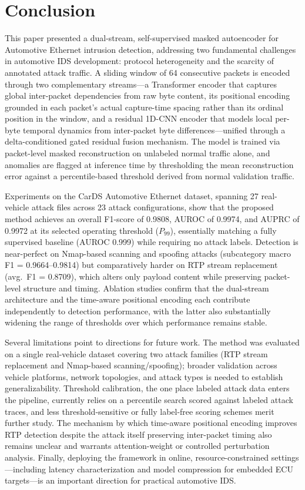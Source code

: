 \section{Conclusion}
\label{sec:conclusion}
This paper presented a dual-stream, self-supervised masked autoencoder for Automotive Ethernet intrusion detection, addressing two fundamental challenges in automotive IDS development: protocol heterogeneity and the scarcity of annotated attack traffic. A sliding window of 64 consecutive packets is encoded through two complementary streams---a Transformer encoder that captures global inter-packet dependencies from raw byte content, its positional encoding grounded in each packet's actual capture-time spacing rather than its ordinal position in the window, and a residual 1D-CNN encoder that models local per-byte temporal dynamics from inter-packet byte differences---unified through a delta-conditioned gated residual fusion mechanism. The model is trained via packet-level masked reconstruction on unlabeled normal traffic alone, and anomalies are flagged at inference time by thresholding the mean reconstruction error against a percentile-based threshold derived from normal validation traffic.

Experiments on the CarDS Automotive Ethernet dataset, spanning 27 real-vehicle attack files across 23 attack configurations, show that the proposed method achieves an overall F1-score of 0.9808, AUROC of 0.9974, and AUPRC of 0.9972 at its selected operating threshold ($P_{99}$), essentially matching a fully supervised baseline (AUROC 0.999) while requiring no attack labels. Detection is near-perfect on Nmap-based scanning and spoofing attacks (subcategory macro F1 = 0.9664--0.9814) but comparatively harder on RTP stream replacement (avg.\ F1 = 0.8709), which alters only payload content while preserving packet-level structure and timing. Ablation studies confirm that the dual-stream architecture and the time-aware positional encoding each contribute independently to detection performance, with the latter also substantially widening the range of thresholds over which performance remains stable.

Several limitations point to directions for future work. The method was evaluated on a single real-vehicle dataset covering two attack families (RTP stream replacement and Nmap-based scanning/spoofing); broader validation across vehicle platforms, network topologies, and attack types is needed to establish generalizability. Threshold calibration, the one place labeled attack data enters the pipeline, currently relies on a percentile search scored against labeled attack traces, and less threshold-sensitive or fully label-free scoring schemes merit further study. The mechanism by which time-aware positional encoding improves RTP detection despite the attack itself preserving inter-packet timing also remains unclear and warrants attention-weight or controlled perturbation analysis. Finally, deploying the framework in online, resource-constrained settings---including latency characterization and model compression for embedded ECU targets---is an important direction for practical automotive IDS.